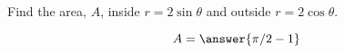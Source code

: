\documentclass{ximera}
\author{David Guichard \and Neal Koblitz \and H. Jerome Keisler \and Albert Scheller \and Barry Balof \and Mike Wills \and Matthew Carr}
\begin{document}
\begin{exercise}





Find the area, $A$, inside $r=2\sin\theta$ and outside $r=2\cos\theta$.
\begin{prompt}
\[
A=\answer{\pi/2-1}
\]
\end{prompt}



\end{exercise}
\end{document}
